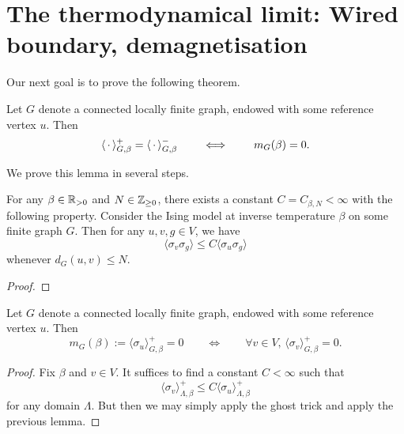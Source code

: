 \section{The thermodynamical limit: Wired boundary, demagnetisation}
\label{sec:vanishing_magnetisation}

Our next goal is to prove the following theorem.

\begin{theorem} 
    \label{thm:vanishing_magnetisation}
    Let $G$ denote a connected locally finite graph,
    endowed with some reference vertex $u$.
    Then 
    \[
        \langle\,\cdot\,\rangle_{G,\beta}^+=\langle\,\cdot\,\rangle_{G,\beta}^-
        \qquad
        \iff 
        \qquad
        m_G(\beta)=0.
    \]
\end{theorem}

We prove this lemma in several steps.

\begin{lemma}
    For any $\beta\in\mathbb R_{>0}$ and $N\in\mathbb Z_{\geq 0}$,
    there exists a constant $C=C_{\beta,N}<\infty$ with the following property.
    Consider the Ising model at inverse temperature $\beta$
    on some finite graph $G$.
    Then for any $u,v,g\in V$,
    we have
    \[
        \langle \sigma_v\sigma_g\rangle \leq C \langle \sigma_u\sigma_g\rangle
    \]
    whenever $d_G(u,v)\leq N$.
\end{lemma}

\begin{proof}
\end{proof}

\begin{lemma}
    Let $G$ denote a connected locally finite graph,
    endowed with some reference vertex $u$.
    Then 
    \[
        m_G(\beta) := \langle \sigma_u\rangle_{G,\beta}^+=0
        \qquad
        \iff
        \qquad
        \forall v\in V,\,
        \langle \sigma_v\rangle_{G,\beta}^+=0
        .
    \]
\end{lemma}

\begin{proof}
    Fix $\beta$ and $v\in V$.
    It suffices to find a constant $C<\infty$ such that
    \[
        \langle \sigma_v\rangle_{\Lambda,\beta}^+
        \leq C\langle \sigma_u\rangle_{\Lambda,\beta}^+
    \]
    for any domain $\Lambda$.
    But then we may simply apply the ghost trick and apply the previous lemma.
\end{proof}

